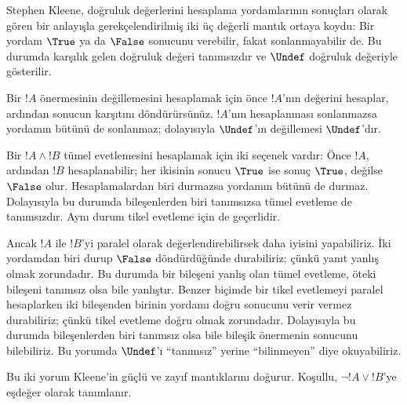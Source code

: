 



Stephen Kleene, doğruluk değerlerini hesaplama yordamlarının sonuçları olarak
gören bir anlayışla gerekçelendirilmiş iki üç değerli mantık ortaya koydu:
Bir yordam $\True$ ya da $\False$ sonucunu verebilir, fakat sonlanmayabilir
de. Bu durumda karşılık gelen doğruluk değeri tanımsızdır ve $\Undef$
doğruluk değeriyle gösterilir.

Bir $!A$ önermesinin değillemesini hesaplamak için önce $!A$'nın değerini
hesaplar, ardından sonucun karşıtını döndürürsünüz. $!A$'nın hesaplanması
sonlanmazsa yordamın bütünü de sonlanmaz; dolayısıyla $\Undef$'ın
değillemesi $\Undef$'dır.

Bir $!A \land !B$ tümel evetlemesini hesaplamak için iki seçenek vardır:
Önce $!A$, ardından $!B$ hesaplanabilir; her ikisinin sonucu $\True$ ise
sonuç $\True$, değilse $\False$ olur. Hesaplamalardan biri durmazsa yordamın
bütünü de durmaz. Dolayısıyla bu durumda bileşenlerden biri tanımsızsa tümel
evetleme de tanımsızdır. Aynı durum tikel evetleme için de geçerlidir.

Ancak $!A$ ile $!B$'yi paralel olarak değerlendirebilirsek daha iyisini
yapabiliriz. İki yordamdan biri durup $\False$ döndürdüğünde durabiliriz;
çünkü yanıt yanlış olmak zorundadır. Bu durumda bir bileşeni yanlış olan
tümel evetleme, öteki bileşeni tanımsız olsa bile yanlıştır. Benzer biçimde
bir tikel evetlemeyi paralel hesaplarken iki bileşenden birinin yordamı doğru
sonucunu verir vermez durabiliriz; çünkü tikel evetleme doğru olmak
zorundadır. Dolayısıyla bu durumda bileşenlerden biri tanımsız olsa bile
bileşik önermenin sonucunu bilebiliriz. Bu yorumda $\Undef$'ı “tanımsız”
yerine “bilinmeyen” diye okuyabiliriz.

Bu iki yorum Kleene'in güçlü ve zayıf mantıklarını doğurur. Koşullu,
$\lnot !A \lor !B$'ye eşdeğer olarak tanımlanır.

